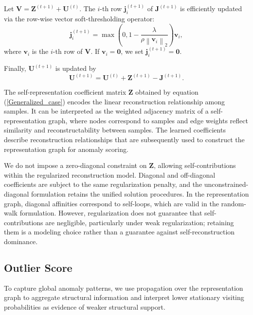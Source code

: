 \documentclass[ASNA,twocolumn]{USG} %
\begin{document}
Let $\boldsymbol{V} = \boldsymbol{Z}^{(t+1)} + \boldsymbol{U}^{(t)}$. The $i$-th row $\boldsymbol{j}_i^{(t+1)}$ of $\boldsymbol{J}^{(t+1)}$ is efficiently updated via the row-wise vector soft-thresholding operator:
\begin{equation}
\boldsymbol{j}_i^{(t+1)} = \max \left( 0, 1 - \frac{\lambda}{\rho \left\|\boldsymbol{v}_i\right\|_2} \right) \boldsymbol{v}_i,
\end{equation}
where $\boldsymbol{v}_i$ is the $i$-th row of $\boldsymbol{V}$. If $\boldsymbol v_i=\boldsymbol0$, we set $\boldsymbol j_i^{(t+1)}=\boldsymbol0$.

Finally, $\boldsymbol{U}^{(t+1)}$ is updated by
\begin{equation}
\boldsymbol{U}^{(t+1)} = \boldsymbol{U}^{(t)} + \boldsymbol{Z}^{(t+1)} - \boldsymbol{J}^{(t+1)}.
\end{equation}

The self-representation coefficient matrix $\boldsymbol{Z}$ obtained by equation (\ref{Generalized_case}) encodes the linear reconstruction relationship among samples. It can be interpreted as the weighted adjacency matrix of a self-representation graph, where nodes correspond to samples and edge weights reflect similarity and reconstructability between samples. The learned coefficients describe reconstruction relationships that are subsequently used to construct the representation graph for anomaly scoring.

We do not impose a zero-diagonal constraint on $\boldsymbol{Z}$, allowing self-contributions within the regularized reconstruction model. Diagonal and off-diagonal coefficients are subject to the same regularization penalty, and the unconstrained-diagonal formulation retains the unified solution procedures. In the representation graph, diagonal affinities correspond to self-loops, which are valid in the random-walk formulation. However, regularization does not guarantee that self-contributions are negligible, particularly under weak regularization; retaining them is a modeling choice rather than a guarantee against self-reconstruction dominance.


\subsection{Outlier Score}

To capture global anomaly patterns, we use propagation over the representation graph to aggregate structural information and interpret lower stationary visiting probabilities as evidence of weaker structural support.
\end{document}
